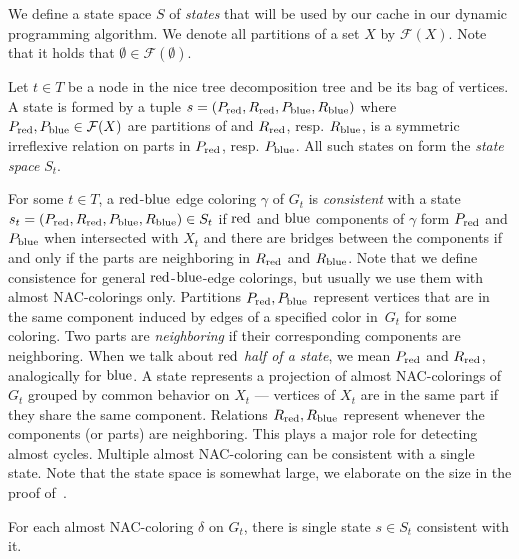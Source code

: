 We define a state space \( S \) of \emph{states}
that will be used by our cache in our dynamic programming algorithm.
We denote all partitions of a set \( X \) by \( \mathcal{F}(X) \).
Note that it holds that \( \emptyset \in \mathcal{F}(\emptyset) \).

%
\begin{definition}
	Let \( t \in T \) be a node in the nice tree decomposition tree and
	\Xt{} be its bag of vertices.
	A state is formed by a tuple \( s = (P_{\text{red}}, R_{\text{red}}, P_{\text{blue}}, R_{\text{blue}}) \)
	where \( P_{\text{red}}, P_{\text{blue}} \in \mathcal{F}(X)\) are partitions of \Xt{}
	and \( R_{\text{red}}\), resp. \(R_{\text{blue}} \), is a symmetric irreflexive relation
	on parts in \( P_{\text{red}}\), resp. \(P_{\text{blue}} \).
	All such states on \Xt{} form the \emph{state space} \( S_t \).
\end{definition}
%
For some \( t \in T \),
a \( \text{red} \)-\( \text{blue} \) edge coloring \( \gamma \) of \( G_t \)
is \emph{consistent} with a state \( s_t = (P_{\text{red}}, R_{\text{red}}, P_{\text{blue}}, R_{\text{blue}}) \in S_t \)
if \( \text{red} \) and \( \text{blue} \) components of \( \gamma \) form \( P_{\text{red}} \) and \( P_{\text{blue}} \)
when intersected with \( X_t \) and
there are bridges between the components if and only if
the parts are neighboring in \( R_{\text{red}} \) and \( R_{\text{blue}} \).
Note that we define consistence for general \( \text{red} \)-\( \text{blue} \)-edge colorings,
but usually we use them with almost NAC-colorings only.
%
Partitions \( P_{\text{red}}, P_{\text{blue}} \) represent vertices
that are in the same component induced by edges of a specified color
in~\( G_t \) for some coloring.
Two parts are \emph{neighboring} if their corresponding components are neighboring.
When we talk about \emph{\( \text{red} \) half of a state},
we mean \( P_{\text{red}} \) and \( R_{\text{red}} \),
analogically for \( \text{blue} \).
%
A state represents a projection of almost NAC-colorings of \( G_t \)
grouped by common behavior on \( X_t \)
--- vertices of \( X_t \) are in the same part if they share the same component.
%
Relations \( R_{\text{red}}, R_{\text{blue}} \) represent
whenever the components (or parts) are neighboring.
This plays a major role for detecting almost cycles.
%
Multiple almost NAC-coloring can be consistent with a single state.
%
Note that the state space is somewhat large,
we elaborate on the size in the proof of~.
%
\begin{observation}
	For each almost NAC-coloring \( \delta \) on \( G_t \),
	there is single state \( s \in S_t \) consistent with it.
\end{observation}
%

